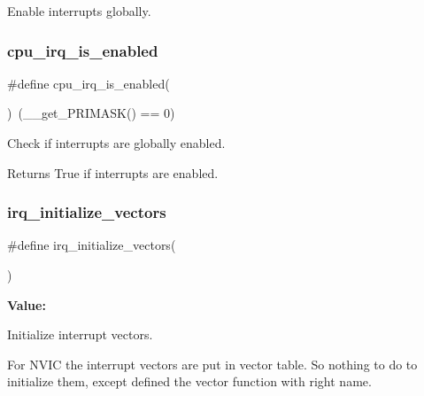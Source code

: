 Enable interrupts globally. 

\mbox{\label{group__interrupt__group_gae1545a2473614564550b9c4015c94978}} 
\subsubsection{\texorpdfstring{cpu\_irq\_is\_enabled}{cpu\_irq\_is\_enabled}}
{\footnotesize\ttfamily \#define cpu\+\_\+irq\+\_\+is\+\_\+enabled(\begin{DoxyParamCaption}{ }\end{DoxyParamCaption})~(\+\_\+\+\_\+get\+\_\+\+P\+R\+I\+M\+A\+SK() == 0)}



Check if interrupts are globally enabled. 

\begin{DoxyReturn}{Returns}
True if interrupts are enabled. 
\end{DoxyReturn}
\mbox{\label{group__interrupt__group_ga931b667f6490ad3d8905fa25bebb24b1}} 
\subsubsection{\texorpdfstring{irq\_initialize\_vectors}{irq\_initialize\_vectors}}
{\footnotesize\ttfamily \#define irq\+\_\+initialize\+\_\+vectors(\begin{DoxyParamCaption}{ }\end{DoxyParamCaption})}

{\bfseries Value\+:}
\begin{DoxyCode}{0}
\DoxyCodeLine{\textcolor{keywordflow}{do} \{                             \(\backslash\)}

\end{DoxyCode}


Initialize interrupt vectors. 

For N\+V\+IC the interrupt vectors are put in vector table. So nothing to do to initialize them, except defined the vector function with right name.


